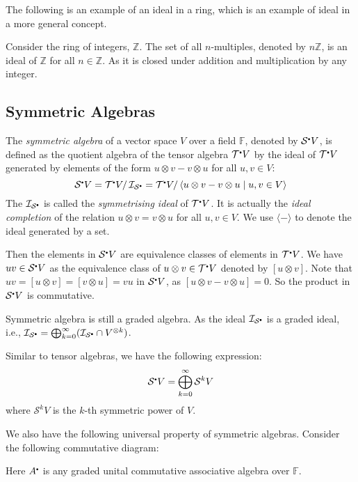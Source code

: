 \documentclass[
	11pt, %
	fleqn, %
	a4paper, %
]{LegrandOrangeBook}
\newcommand{\smallbullet}{\scalebox{0.5}{$\bullet$}}
\renewcommand{\bar}[1]{\overline{#1}} %
\newcommand{\quotient}[2]{#1/\, #2} %
\newcommand{\F}{\mathbb{F}} %
\newcommand{\T}{\mathcal{T}^{\smallbullet}} %
\newcommand{\Sym}{\mathcal{S}^{\smallbullet}} %
\newcommand{\ideal}{\mathcal{I}} %
\newcommand{\Z}{\mathbb{Z}} %
\begin{document}
The following is an example of an ideal in a ring, which is an example of ideal in a more general concept.
\begin{example}
    Consider the ring of integers, $\Z$. The set of all $n$-multiples, denoted by $n\Z$, is an ideal of $\Z$ for all $n \in \Z$. As it is closed under addition and multiplication by any integer.
\end{example}

\subsection{Symmetric Algebras}

The \emph{symmetric algebra} of a vector space $V$ over a field $\F$, denoted by $\Sym V$, is defined as the quotient algebra of the tensor algebra $\T V$ by the ideal of $\T V$ generated by elements of the form $u \otimes v - v \otimes u$ for all $u, v \in V$:
\[
    \Sym V = \quotient{\T V}{\ideal_{\Sym}} = \quotient{\T V}{\langle u \otimes v - v \otimes u \mid u, v \in V \rangle}
\]
The $\ideal_{\Sym}$ is called the \emph{symmetrising ideal} of $\T V$. It is actually the \emph{ideal completion} of the relation $u \otimes v = v \otimes u$ for all $u, v \in V$. We use $\langle - \rangle$ to denote the ideal generated by a set.

Then the elements in $\Sym V$ are equivalence classes of elements in $\T V$. We have $uv \in \Sym V$ as the equivalence class of $u \otimes v \in \T V$ denoted by $[u \otimes v]$. Note that $uv = [u \otimes v] = [v \otimes u] = vu$ in $\Sym V$, as $[u \otimes v - v \otimes u] = 0$. So the product in $\Sym V$ is commutative. 
\begin{remark}
    Symmetric algebra is still a graded algebra. As the ideal $\ideal_{\Sym}$ is a graded ideal, i.e., $\ideal_{\Sym} = \bigoplus_{k = 0}^{\infty} (\ideal_{\Sym} \cap V^{\otimes k})$.
\end{remark}

Similar to tensor algebras, we have the following expression:
\[
    \Sym V = \bigoplus_{k = 0}^{\infty} \mathcal{S}^k V
\]
where $\mathcal{S}^k V$ is the $k$-th symmetric power of $V$.

We also have the following universal property of symmetric algebras. Consider the following commutative diagram:
\begin{center}
\end{center}
Here $A^{\smallbullet}$ is any graded unital commutative associative algebra over $\F$.
\end{document}
